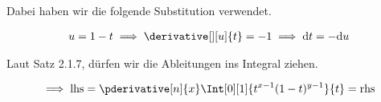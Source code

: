 \begin{solution}
\begin{enumerate}[label = \arabic*.]
    Dabei haben wir die folgende Substitution verwendet.
    
    \begin{align*}
        u = 1 - t
        \implies
        \derivative[][u]{t} = -1
        \implies
        \mathrm{d}t = -\mathrm{d}u
    \end{align*}

\end{enumerate}

Laut Satz 2.1.7, dürfen wir die Ableitungen ins Integral ziehen.

\begin{align*}
    \implies
    \mathrm{lhs}
    =
    \pderivative[n]{x}
    \Int[0][1]
    {
        t^{x-1} (1 - t)^{y-1}
    }{t}
    =
    \mathrm{rhs}
\end{align*}

\end{solution}

